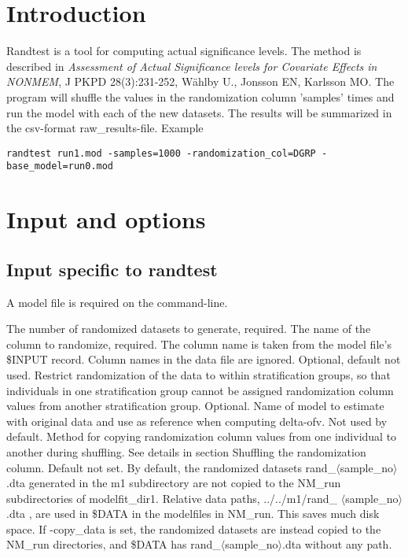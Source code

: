 


\maketitle


\section{Introduction}

Randtest is a tool for computing actual significance levels. The method is described in
\emph{Assessment of Actual Significance levels for Covariate Effects in NONMEM}, 
J PKPD 28(3):231-252, Wählby U., Jonsson EN, Karlsson MO. 
The program will shuffle the values in the randomization 
column 'samples' times and run the model with each of the new datasets. The results will be summarized in the csv-format raw\_results-file. 
Example
\begin{verbatim}
randtest run1.mod -samples=1000 -randomization_col=DGRP -base_model=run0.mod
\end{verbatim}

\section{Input and options}
\subsection{Input specific to randtest}
A model file is required on the command-line.
\begin{optionlist}
The number of randomized datasets to generate, required. 
\nextopt
{}
The name of the column to randomize, required. The column name is taken from the model file's \$INPUT record. Column names in the data file are ignored. 
\nextopt
{}
Optional, default not used. Restrict randomization of the data to within stratification groups, so that individuals in one stratification group cannot be assigned randomization column values from another stratification group. 
\nextopt
{}
Optional. Name of model to estimate with original data and use as reference when computing delta-ofv. 
\nextopt
{}
Not used by default. Method for copying randomization column values from one individual to another during shuffling. See details in section Shuffling the randomization column.     
\nextopt
{}
Default not set. By default, the randomized datasets rand\_$\langle$sample\_no$\rangle$.dta generated in the m1 subdirectory are not copied to the NM\_run subdirectories of modelfit\_dir1. Relative data paths, ../../m1/rand\_ $\langle$sample\_no$\rangle$.dta , are used in \$DATA in the modelfiles in NM\_run. This saves much disk space. If \mbox{-copy\_data} is set, the randomized datasets are instead copied to the NM\_run directories, and \$DATA has  rand\_$\langle$sample\_no$\rangle$.dta without any path. 
\nextopt
\end{optionlist}

